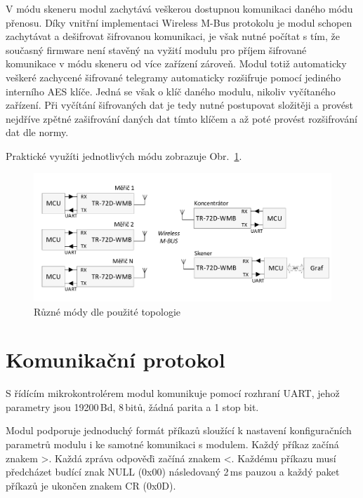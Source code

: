 V módu skeneru modul zachytává veškerou dostupnou komunikaci daného módu přenosu. Díky vnitřní implementaci Wireless M-Bus protokolu je modul schopen zachytávat a dešifrovat šifrovanou komunikaci, je však nutné počítat s tím, že současný firmware není stavěný na vyžití modulu pro příjem šifrované komunikace v módu skeneru od více zařízení zároveň. Modul totiž automaticky veškeré zachycené šifrované telegramy automaticky rozšifruje pomocí jediného interního AES klíče. Jedná se však o klíč daného modulu, nikoliv vyčítaného zařízení. Při vyčítání šifrovaných dat je tedy nutné postupovat složitěji a provést nejdříve zpětné zašifrování daných dat tímto klíčem a až poté provést rozšifrování dat dle normy.

Praktické využíti jednotlivých módu zobrazuje Obr.~\ref{TopologieIQRF}.

 \begin{figure}[!ht]
  \begin{center}
    \includegraphics[scale=0.65]{obrazky/modul_topologie}
  \end{center}
  \caption{Různé módy dle použité topologie \cite{ModulIQRF}}
	\label{TopologieIQRF}
\end{figure}

\section{Komunikační protokol}

S řídícím mikrokontrolérem modul komunikuje pomocí rozhraní UART, jehož parametry jsou 19200\,Bd, 8\,bitů, žádná parita a 1 stop bit.
		
Modul podporuje jednoduchý formát příkazů sloužící k nastavení konfiguračních parametrů modulu i ke samotné komunikaci s modulem. Každý příkaz začíná znakem \textgreater. Každá zpráva odpověďi začíná znakem \textless. Každému příkazu musí předcházet budící znak NULL (0x00) následovaný 2\,ms pauzou a každý paket příkazů je ukončen znakem CR (0x0D). 

